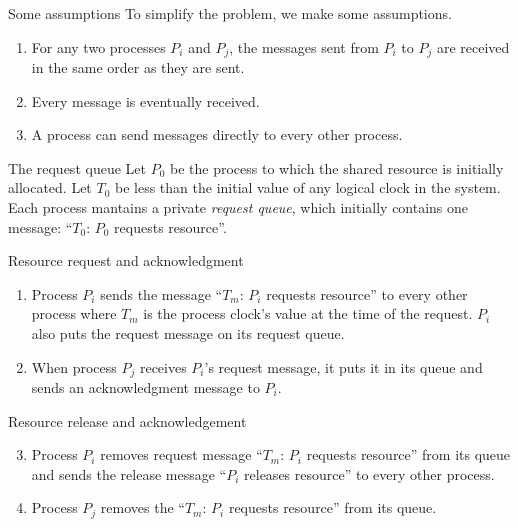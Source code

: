 \documentclass[12pt]{beamer}
\begin{document}
    \begin{frame}{Some assumptions}
        To simplify the problem, we make some assumptions.
        \begin{enumerate}
            \item For any two processes \(P_i\) and \(P_j\), the messages sent from
            \(P_i\) to \(P_j\) are received in the same order as they are sent.
            \item Every message is eventually received.
            \item A process can send messages directly to every other process.
        \end{enumerate}
    \end{frame}

    \begin{frame}{The request queue}
        Let \(P_0\) be the process to which the shared resource is initially allocated.
        Let \(T_0\) be less than the initial value of any logical clock in the system.
        Each process mantains a private \emph{request queue}, which initially contains
        one message: ``\(T_0\): \(P_0\) requests resource''.
    \end{frame}

    \begin{frame}{Resource request and acknowledgment}
        \begin{enumerate}
            \item Process \(P_i\) sends the message ``\(T_m\): \(P_i\) requests
            resource'' to every other process where \(T_m\) is the process clock's value
            at the time of the request. \(P_i\) also puts the request message on its
            request queue.
            \item When process \(P_j\) receives \(P_i\)'s request message, it puts it
            in its queue and sends an acknowledgment message to \(P_i\).
        \end{enumerate}
    \end{frame}

    \begin{frame}{Resource release and acknowledgement}
        \begin{enumerate}
            \setcounter{enumi}{2}
            \item Process \(P_i\) removes request message ``\(T_m\): \(P_i\) requests
            resource'' from its queue and sends the release message ``\(P_i\) releases
            resource'' to every other process.
            \item Process \(P_j\) removes the ``\(T_m\): \(P_i\) requests resource''
            from its queue.
        \end{enumerate}
    \end{frame}
\end{document}
